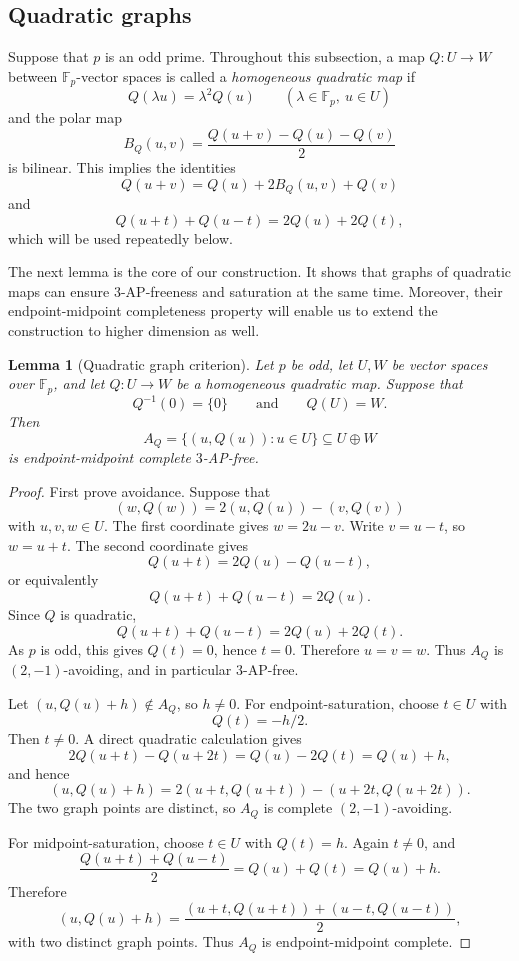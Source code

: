 \documentclass[11pt]{article}
\newtheorem{lemma}[theorem]{Lemma}
\newcommand{\F}{\mathbb F}
\begin{document}
	\subsection{Quadratic graphs} Suppose that $p$ is an odd prime.
	Throughout this subsection, a map \(Q:U\to W\) between \(\mathbb F_p\)-vector
	spaces is called a \textit{homogeneous quadratic map} if
	\[
	Q(\lambda u)=\lambda^2 Q(u)
	\qquad(\lambda\in\mathbb F_p,\ u\in U)
	\]
	and the polar map
	\[
	B_Q(u,v)=\frac{Q(u+v)-Q(u)-Q(v)}{2}
	\]
	is bilinear. This implies the identities
	\[
	Q(u+v)=Q(u)+2B_Q(u,v)+Q(v)
	\]
	and
	\[
	Q(u+t)+Q(u-t)=2Q(u)+2Q(t),
	\]
	which will be used repeatedly below.
	
	The next lemma is the core of our construction. It shows that graphs of quadratic maps can ensure $3$-AP-freeness and saturation at the same time. Moreover, their endpoint-midpoint completeness property will enable us to extend the construction to higher dimension as well.
	
	\begin{lemma}[Quadratic graph criterion]\label{lem:quadratic-graph-twosided}
		Let $p$ be odd, let $U,W$ be vector spaces over $\F_p$, and let
		$Q:U\to W$ be a homogeneous quadratic map.  Suppose that
		\[
		Q^{-1}(0)=\{0\}
		\qquad\text{and}\qquad
		Q(U)=W .
		\]
		Then
		\[
		A_Q=\{(u,Q(u)):u\in U\}\subseteq U\oplus W
		\]
		is endpoint-midpoint complete  $3$-AP-free.  %
	\end{lemma}
	
	\begin{proof}
		First prove avoidance.  Suppose that
		\[
		(w,Q(w))=2(u,Q(u))-(v,Q(v))
		\]
		with $u,v,w\in U$.  The first coordinate gives $w=2u-v$.  Write
		$v=u-t$, so $w=u+t$.  The second coordinate gives
		\[
		Q(u+t)=2Q(u)-Q(u-t),
		\]
		or equivalently
		\[
		Q(u+t)+Q(u-t)=2Q(u).
		\]
		Since $Q$ is quadratic,
		\[
		Q(u+t)+Q(u-t)=2Q(u)+2Q(t).
		\]
		As $p$ is odd, this gives $Q(t)=0$, hence $t=0$.  Therefore $u=v=w$.
		Thus $A_Q$ is $(2,-1)$-avoiding, and in particular $3$-AP-free.
		
		Let $(u,Q(u)+h)\notin A_Q$, so $h\ne0$.  For endpoint-saturation, choose
		$t\in U$ with
		\[
		Q(t)=-h/2 .
		\]
		Then $t\ne0$.  A direct quadratic calculation gives
		\[
		2Q(u+t)-Q(u+2t)=Q(u)-2Q(t)=Q(u)+h,
		\]
		and hence
		\[
		(u,Q(u)+h)
		=2(u+t,Q(u+t))-(u+2t,Q(u+2t)).
		\]
		The two graph points are distinct, so $A_Q$ is complete $(2,-1)$-avoiding.
		
		For midpoint-saturation, choose $t\in U$ with $Q(t)=h$.  Again $t\ne0$, and
		\[
		\frac{Q(u+t)+Q(u-t)}2=Q(u)+Q(t)=Q(u)+h.
		\]
		Therefore
		\[
		(u,Q(u)+h)
		=\frac{(u+t,Q(u+t))+(u-t,Q(u-t))}{2},
		\]
		with two distinct graph points.  Thus $A_Q$ is endpoint-midpoint complete.
	\end{proof}
	
\end{document}

